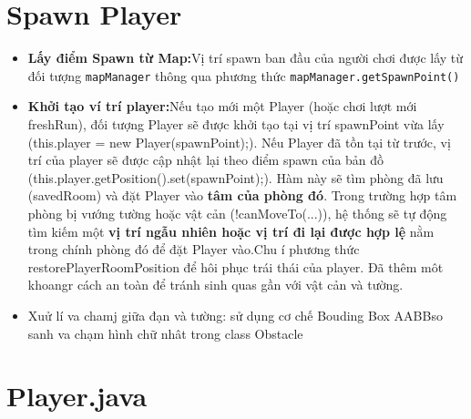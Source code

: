 \documentclass[12pt,a4paper]{report}
\begin{document}
    \chapter{Spawn Player}
    \begin{itemize}
        \item \textbf{Lấy điểm Spawn từ Map:}Vị trí spawn ban đầu của người chơi được lấy từ đối
        tượng \texttt{mapManager} thông qua phương thức \texttt{mapManager.getSpawnPoint()}
        \item \textbf{Khởi tạo ví trí player:}Nếu tạo mới một Player (hoặc chơi lượt mới freshRun),
        đối tượng Player sẽ được khởi tạo tại vị trí spawnPoint vừa
        lấy (this.player = new Player(spawnPoint);). Nếu Player đã tồn tại từ trước, vị trí của player
        sẽ được cập nhật lại theo điểm spawn của bản đồ (this.player.getPosition().set(spawnPoint);).
        Hàm này sẽ tìm phòng đã lưu (savedRoom) và đặt Player vào
        \textbf{tâm của phòng đó}. Trong trường hợp tâm phòng bị vướng tường hoặc vật cản (!canMoveTo(...)),
        hệ thống sẽ tự động tìm kiếm một \textbf{vị trí ngẫu nhiên hoặc vị trí đi lại được hợp lệ}
        nằm trong chính phòng đó để đặt Player vào.Chu í phương thức restorePlayerRoomPosition để
        hôi phục trái thái của player. Đã thêm môt khoangr cách an toàn để tránh sinh quas gần với vật cản và tường.
        \item Xuử lí va chamj giữa đạn và tường: sử dụng cơ chế Bouding Box AABBso sanh va chạm hình chữ nhât
        trong class Obstacle
    \end{itemize}
    \chapter{Player.java}
    
\end{document}
